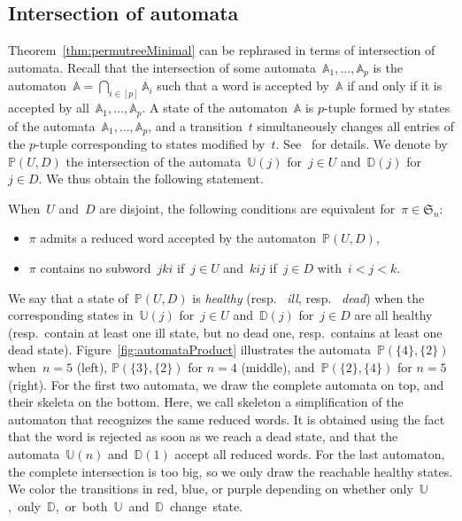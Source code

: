 \documentclass[ALCO]{cedram}
\newcommand{\fS}{\mathfrak{S}}
\newcommand{\defn}[1]{\textsl{\color{darkblue} #1}}
\newcommand{\automatonA}{\mathbb{A}}
\newcommand{\automatonP}{\mathbb{P}}
\newcommand{\automatonU}{\mathbb{U}}
\newcommand{\automatonD}{\mathbb{D}}
\begin{document}
\subsection{Intersection of automata}

Theorem~\ref{thm:permutreeMinimal} can be rephrased in terms of intersection of automata.
Recall that the intersection of some automata~$\automatonA_1, \dots, \automatonA_p$ is the automaton~$\automatonA = \bigcap_{i \in [p]} \automatonA_i$ such that a word is accepted by~$\automatonA$ if and only if it is accepted by all~$\automatonA_1, \dots, \automatonA_p$.
A state of the automaton~$\automatonA$ is $p$-tuple formed by states of the automata~$\automatonA_1, \dots, \automatonA_p$, and a transition~$t$ simultaneously changes all entries of the $p$-tuple corresponding to states modified by~$t$.
See~\cite[p.\,59--60]{HopcroftUllman} for details.
We denote by~$\automatonP(U,D)$ the intersection of the automata~$\automatonU(j)$ for~$j \in U$ and~$\automatonD(j)$ for~$j \in D$.
We thus obtain the following statement.

\begin{corollary}
\label{coro:permutreeMinimal}
When~$U$ and~$D$ are disjoint, the following conditions are equivalent for~$\pi \in \fS_n$:
\begin{itemize}
	\item $\pi$ admits a reduced word accepted by the automaton~$\automatonP(U,D)$,
	\item $\pi$ contains no subword~$jki$ if~$j \in U$ and~$kij$ if~$j \in D$ with~$i < j < k$.
\end{itemize}
\end{corollary}

We say that a state of~$\automatonP(U,D)$ is \defn{healthy} (resp.~\defn{ill}, resp.~\defn{dead}) when the corresponding states in~$\automatonU(j)$ for~$j \in U$ and~$\automatonD(j)$ for~$j \in D$ are all healthy (resp.~contain at least one ill state, but no dead one, resp.~contains at least one dead state).
Figure~\ref{fig:automataProduct} illustrates the automata~$\automatonP(\{4\},\{2\})$ when~$n = 5$ (left), $\automatonP(\{3\},\{2\})$ for $n=4$ (middle), and~$\automatonP(\{2\},\{4\})$ for $n=5$ (right).
For the first two automata, we draw the complete automata on top, and their skeleta on the bottom.
Here, we call skeleton a simplification of the automaton that recognizes the same reduced words.
It is obtained using the fact that the word is rejected as soon as we reach a dead state, and that the automata~$\automatonU(n)$ and~$\automatonD(1)$ accept all reduced words.
For the last automaton, the complete intersection is too big, so we only draw the reachable healthy states.
We color the transitions in red, blue, or purple depending on whether \mbox{only~$\automatonU$, only $\automatonD$, or both~$\automatonU$ and~$\automatonD$ change state}.
\end{document}
